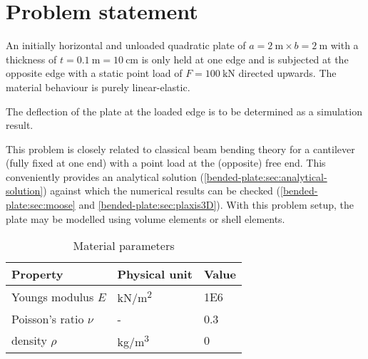 \section{Problem statement}

An initially horizontal and unloaded quadratic plate of $a = \qty{2}{\metre}
    \times b = \qty{2}{\metre}$ with a thickness of $t = \qty{0.1}{\metre} =
    \qty{10}{\centi\metre}$ is only held at one edge and is subjected at the
opposite edge with a static point load of $F = \qty{100}{\kilo\newton}$
directed upwards. The material behaviour is purely linear-elastic.

The deflection of the plate at the loaded edge is to be determined as a
simulation result.

This problem is closely related to classical beam bending theory for a
cantilever (fully fixed at one end) with a point load at the (opposite) free
end. This conveniently provides an analytical solution
(\autoref{bended-plate:sec:analytical-solution}) against which the numerical
results can be checked (\autoref{bended-plate:sec:moose} and
\autoref{bended-plate:sec:plaxis3D}). With this problem setup, the plate may be
modelled using volume elements or shell elements.

\begin{table}[htbp]
    \centering
    \caption{Material parameters}
    \label{bended-plate:material-parameters}
    \begin{tabularx}{\textwidth}{XYY}

        \hline

        Property              & Physical unit                                         & Value      \\

        \hline

        Youngs modulus $E$    & \si[per-mode = symbol]{\kilo\newton\per\square\metre} &
        \SI{1E6}{}                                                                                 \\

        Poisson's ratio $\nu$ & -                                                     & \SI{0.3}{} \\

        density $\rho$        & \si[per-mode = symbol]{\kilogram\per\cubic\metre}     & \SI{0}{}
        \\

        \hline
    \end{tabularx}
\end{table}

